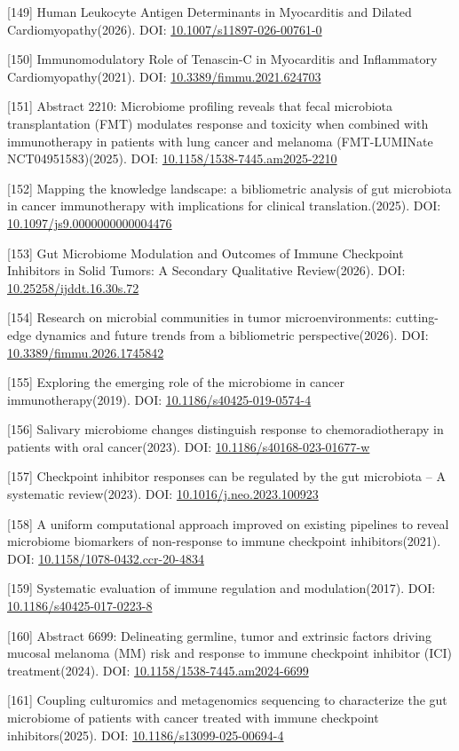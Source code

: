 \documentclass[11pt]{article}
\begin{document}
{[}149{]} Human Leukocyte Antigen Determinants in Myocarditis and Dilated Cardiomyopathy(2026). DOI: \url{10.1007/s11897-026-00761-0}

{[}150{]} Immunomodulatory Role of Tenascin-C in Myocarditis and Inflammatory Cardiomyopathy(2021). DOI: \url{10.3389/fimmu.2021.624703}

{[}151{]} Abstract 2210: Microbiome profiling reveals that fecal microbiota transplantation (FMT) modulates response and toxicity when combined with immunotherapy in patients with lung cancer and melanoma (FMT-LUMINate NCT04951583)(2025). DOI: \url{10.1158/1538-7445.am2025-2210}

{[}152{]} Mapping the knowledge landscape: a bibliometric analysis of gut microbiota in cancer immunotherapy with implications for clinical translation.(2025). DOI: \url{10.1097/js9.0000000000004476}

{[}153{]} Gut Microbiome Modulation and Outcomes of Immune Checkpoint Inhibitors in Solid Tumors: A Secondary Qualitative Review(2026). DOI: \url{10.25258/ijddt.16.30s.72}

{[}154{]} Research on microbial communities in tumor microenvironments: cutting-edge dynamics and future trends from a bibliometric perspective(2026). DOI: \url{10.3389/fimmu.2026.1745842}

{[}155{]} Exploring the emerging role of the microbiome in cancer immunotherapy(2019). DOI: \url{10.1186/s40425-019-0574-4}

{[}156{]} Salivary microbiome changes distinguish response to chemoradiotherapy in patients with oral cancer(2023). DOI: \url{10.1186/s40168-023-01677-w}

{[}157{]} Checkpoint inhibitor responses can be regulated by the gut microbiota -- A systematic review(2023). DOI: \url{10.1016/j.neo.2023.100923}

{[}158{]} A uniform computational approach improved on existing pipelines to reveal microbiome biomarkers of non-response to immune checkpoint inhibitors(2021). DOI: \url{10.1158/1078-0432.ccr-20-4834}

{[}159{]} Systematic evaluation of immune regulation and modulation(2017). DOI: \url{10.1186/s40425-017-0223-8}

{[}160{]} Abstract 6699: Delineating germline, tumor and extrinsic factors driving mucosal melanoma (MM) risk and response to immune checkpoint inhibitor (ICI) treatment(2024). DOI: \url{10.1158/1538-7445.am2024-6699}

{[}161{]} Coupling culturomics and metagenomics sequencing to characterize the gut microbiome of patients with cancer treated with immune checkpoint inhibitors(2025). DOI: \url{10.1186/s13099-025-00694-4}
\end{document}
